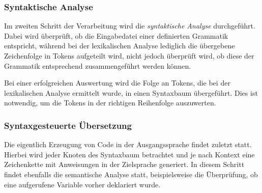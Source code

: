 \subsubsection{Syntaktische Analyse}
Im zweiten Schritt der Verarbeitung wird die \textit{syntaktische Analyse} durchgeführt. Dabei wird überprüft, ob die Eingabedatei einer definierten Grammatik entspricht, während bei der lexikalischen Analyse lediglich die übergebene Zeichenfolge in Tokens aufgeteilt wird, nicht jedoch überprüft wird, ob diese der Grammatik entsprechend zusammengeführt werden können. 

Bei einer erfolgreichen Auswertung wird die Folge an Tokens, die bei der lexikalischen Analyse ermittelt wurde, in einen Syntaxbaum übergeführt. Dies ist notwendig, um die Tokens in der richtigen Reihenfolge auszuwerten. 

\subsubsection{Syntaxgesteuerte Übersetzung}
Die eigentlich Erzeugung von Code in der Ausgangssprache findet zuletzt statt. Hierbei wird jeder Knoten des Syntaxbaum betrachtet und je nach Kontext eine Zeichenkette mit Anweisungen in der Zielsprache generiert. In diesem Schritt findet ebenfalls die semantische Analyse statt, beispielsweise die Überprüfung, ob eine aufgerufene Variable vorher deklariert wurde.
